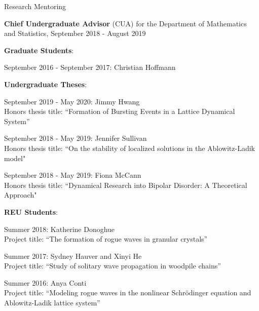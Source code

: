 \documentclass[10pt]{article} %
\newenvironment{outerlist}[1][\enskip\textbullet]%
        {\begin{itemize}[#1]}{\end{itemize}%
         \vspace{-.6\baselineskip}}
\newenvironment{innerlist}[1][\enskip\textbullet]%
        {\begin{compactitem}[#1]}{\end{compactitem}}
\begin{document}
\begin{section}{Research Mentoring}
\begin{outerlist}
\begin{innerlist}
\item[$\triangleright$] \textbf{Chief Undergraduate Advisor}
(CUA) for the Department of Mathematics and Statistics, September 2018 - August 2019
\item[$\triangleright$] \textbf{Graduate Students}:
\begin{innerlist}
\item[$\star$] September 2016 - September 2017: Christian Hoffmann
\end{innerlist}
\item[$\triangleright$] \textbf{Undergraduate Theses}:
\begin{innerlist}
\item[$\star$] September 2019 - May 2020: Jimmy Hwang\\
Honors thesis title: ``Formation of Bursting Events in a Lattice Dynamical System''
\item[$\star$] September 2018 - May 2019: Jennifer Sullivan\\
Honors thesis title: ``On the stability of localized solutions in the Ablowitz-Ladik model"
\item[$\star$] September 2018 - May 2019: Fiona McCann\\
Honors thesis title: ``Dynamical Research into Bipolar Disorder: A Theoretical Approach"
\end{innerlist}
\item[$\triangleright$] \textbf{REU Students}:
\begin{innerlist}
\item[$\star$] Summer 2018: Katherine Donoghue\\
Project title: ``The formation of rogue waves in granular crystals''
\item[$\star$]  Summer 2017: Sydney Hauver and Xinyi He\\
Project title: ``Study of solitary wave propagation in woodpile chains''
\item[$\star$] Summer 2016: Anya Conti \\
Project title: ``Modeling rogue waves in the nonlinear Schr\"odinger
equation and Ablowitz-Ladik lattice system''
\end{innerlist}

\end{innerlist}
\end{outerlist}

\end{section}
\end{document}
